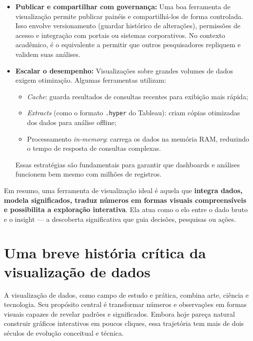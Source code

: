 \begin{itemize}[leftmargin=*]
  \item \textbf{Publicar e compartilhar com governança:}  
  Uma boa ferramenta de visualização permite publicar painéis e compartilhá-los de forma controlada.  
  Isso envolve versionamento (guardar histórico de alterações), permissões de acesso e integração com portais ou sistemas corporativos.  
  No contexto acadêmico, é o equivalente a permitir que outros pesquisadores repliquem e validem suas análises.

  \item \textbf{Escalar o desempenho:}  
  Visualizações sobre grandes volumes de dados exigem otimização.  
  Algumas ferramentas utilizam:
  \begin{itemize}
    \item \textit{Cache}: guarda resultados de consultas recentes para exibição mais rápida;
    \item \textit{Extracts} (como o formato \texttt{.hyper} do Tableau): criam cópias otimizadas dos dados para análise offline;
    \item Processamento \textit{in-memory}: carrega os dados na memória RAM, reduzindo o tempo de resposta de consultas complexas.
  \end{itemize}
  Essas estratégias são fundamentais para garantir que dashboards e análises funcionem bem mesmo com milhões de registros.
\end{itemize}

Em resumo, uma ferramenta de visualização ideal é aquela que \textbf{integra dados, modela significados, traduz números em formas visuais compreensíveis e possibilita a exploração interativa}.  
Ela atua como o elo entre o dado bruto e o insight — a descoberta significativa que guia decisões, pesquisas ou ações.


\section{Uma breve história crítica da visualização de dados}

A visualização de dados, como campo de estudo e prática, combina arte, ciência e tecnologia. Seu propósito central é transformar números e observações em formas visuais capazes de revelar padrões e significados. Embora hoje pareça natural construir gráficos interativos em poucos cliques, essa trajetória tem mais de dois séculos de evolução conceitual e técnica.


